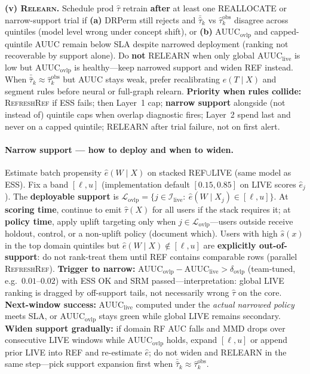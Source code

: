 \textbf{(v) \textsc{Relearn}.}
Schedule prod $\hat\tau$ retrain \textbf{after} at least one REALLOCATE or narrow-support trial if \textbf{(a)} DRPerm still rejects and $\bar{\hat\tau}_k$ vs $\widehat{\tau}^{\mathrm{obs}}_k$ disagree across quintiles (model level wrong under concept shift), or \textbf{(b)} $\mathrm{AUUC}_{\mathrm{ovlp}}$ and capped-quintile AUUC remain below SLA despite narrowed deployment (ranking not recoverable by support alone).
Do \textbf{not} RELEARN when only global $\mathrm{AUUC}_{\mathrm{live}}$ is low but $\mathrm{AUUC}_{\mathrm{ovlp}}$ is healthy---keep narrowed support and widen REF instead.
When $\bar{\hat\tau}_k\approx\widehat{\tau}^{\mathrm{obs}}_k$ but AUUC stays weak, prefer recalibrating $e(T\mid X)$ and segment rules before neural or full-graph relearn.
\textbf{Priority when rules collide:} \textsc{RefreshRef} if ESS fails; then Layer~1 cap; \textbf{narrow support} alongside (not instead of) quintile caps when overlap diagnostic fires; Layer~2 spend last and never on a capped quintile; RELEARN after trial failure, not on first alert.

\paragraph{Narrow support --- how to deploy and when to widen.}
Estimate batch propensity $\hat e(W\mid X)$ on stacked REF$\cup$LIVE (same model as ESS).
Fix a band $[\ell,u]$ (implementation default $[0.15,0.85]$ on LIVE scores $\hat e_j$).
The \textbf{deployable support} is $\mathcal{L}_{\mathrm{ovlp}}=\{j\in\mathcal{I}_{\mathrm{live}}:\ \hat e(W\mid X_j)\in[\ell,u]\}$.
At \textbf{scoring time}, continue to emit $\hat\tau(X)$ for all users if the stack requires it; at \textbf{policy time}, apply uplift targeting only when $j\in\mathcal{L}_{\mathrm{ovlp}}$---users outside receive holdout, control, or a non-uplift policy (document which).
Users with high $\hat s(x)$ in the top domain quintiles but $\hat e(W\mid X)\notin[\ell,u]$ are \textbf{explicitly out-of-support}: do not rank-treat them until REF contains comparable rows (parallel \textsc{RefreshRef}).
\textbf{Trigger to narrow:} $\mathrm{AUUC}_{\mathrm{ovlp}}-\mathrm{AUUC}_{\mathrm{live}}>\delta_{\mathrm{ovlp}}$ (team-tuned, e.g.\ $0.01$--$0.02$) with ESS OK and SRM passed---interpretation: global LIVE ranking is dragged by off-support tails, not necessarily wrong $\hat\tau$ on the core.
\textbf{Next-window success:} $\mathrm{AUUC}_{\mathrm{live}}$ computed under the \emph{actual narrowed policy} meets SLA, or $\mathrm{AUUC}_{\mathrm{ovlp}}$ stays green while global LIVE remains secondary.
\textbf{Widen support gradually:} if domain RF AUC falls and MMD drops over consecutive LIVE windows while $\mathrm{AUUC}_{\mathrm{ovlp}}$ holds, expand $[\ell,u]$ or append prior LIVE into REF and re-estimate $\hat e$; do not widen and RELEARN in the same step---pick support expansion first when $\bar{\hat\tau}_k\approx\widehat{\tau}^{\mathrm{obs}}_k$.

